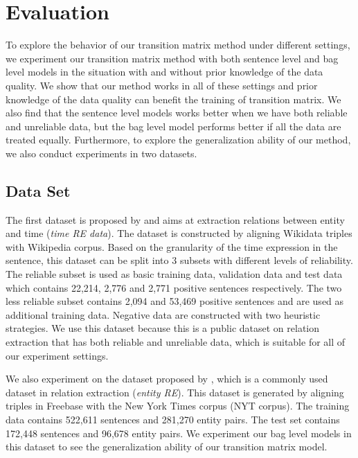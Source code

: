 \section{Evaluation \label{evaluation}}
To explore the behavior of our transition matrix method under different settings, we experiment our transition matrix method with both sentence level and bag level models in the situation with and without prior knowledge of the data quality. We show that our method works in all of these settings and prior knowledge of the data quality can benefit the training of transition matrix. We also find that the sentence level models works better when we have both reliable and unreliable data, but the bag level model performs better if all the data are treated equally. Furthermore, to explore the generalization ability of our method, we also conduct experiments in two datasets.
\subsection{Data Set}
The first dataset is proposed by \cite{luo2016temporal} and aims at extraction relations between entity and time (\emph{time RE data}). The dataset is constructed by aligning Wikidata triples with Wikipedia corpus. Based on the granularity of the time expression in the sentence, this dataset can be split into 3 subsets with different levels of reliability. The reliable subset is used as basic training data, validation data and test data which contains 22,214, 2,776 and 2,771 positive sentences respectively. The two less reliable subset contains 2,094 and 53,469 positive sentences and are used as additional training data. Negative data are constructed with two heuristic strategies. We use this dataset because this is a public dataset on relation extraction that has both reliable and unreliable data, which is suitable for all of our experiment settings.

We also experiment on the dataset proposed by \cite{riedel2010modeling}, which is a commonly used dataset in relation extraction (\emph{entity RE}). This dataset is generated by aligning triples in Freebase with the New York Times corpus (NYT corpus). The training data contains 522,611 sentences and 281,270 entity pairs. The test set contains 172,448 sentences and 96,678 entity pairs. We experiment our bag level models in this dataset to see the generalization ability of our transition matrix model.

